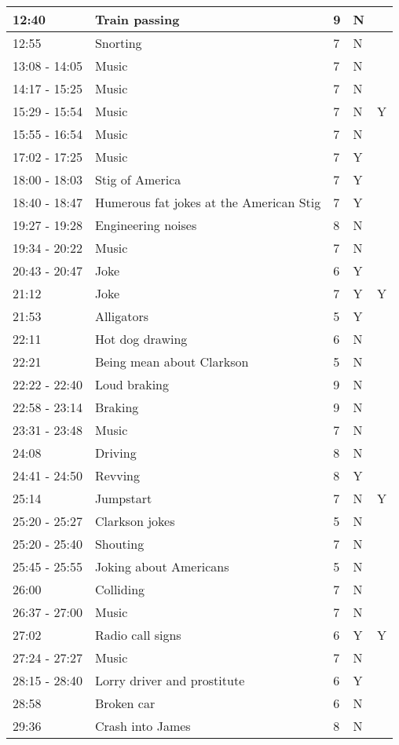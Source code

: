 \begin{longtable}{| p{70pt} | p{130pt} | p{45pt} | p{57pt} | p{60pt}|}
12:40 & Train passing & 9 & N&\\\hline
12:55 & Snorting & 7 & N&\\\hline
13:08 - 14:05 & Music & 7 & N&\\\hline
14:17 - 15:25 & Music & 7 & N&\\\hline
15:29 - 15:54 & Music & 7 & N&Y\\\hline
15:55 - 16:54 & Music & 7 & N&\\\hline
17:02 - 17:25 & Music & 7 & Y&\\\hline
18:00 - 18:03 & Stig of America & 7 & Y&\\\hline
18:40 - 18:47 & Humerous fat jokes at the American Stig & 7 & Y&\\\hline
19:27 - 19:28 & Engineering noises & 8 & N&\\\hline
19:34 - 20:22 & Music & 7 & N&\\\hline
20:43 - 20:47 & Joke & 6 & Y&\\\hline
21:12 & Joke & 7 & Y&Y\\\hline
21:53 & Alligators & 5 & Y&\\\hline
22:11 & Hot dog drawing & 6 & N&\\\hline
22:21 & Being mean about Clarkson & 5 & N&\\\hline
22:22 - 22:40 & Loud braking & 9 & N&\\\hline
22:58 - 23:14 & Braking & 9 & N&\\\hline
23:31 - 23:48 & Music & 7 & N&\\\hline
24:08 & Driving & 8 & N&\\\hline
24:41 - 24:50 & Revving & 8 & Y&\\\hline
25:14 & Jumpstart & 7 & N&Y\\\hline
25:20 - 25:27 & Clarkson jokes & 5 & N&\\\hline
25:20 - 25:40 & Shouting & 7 & N&\\\hline
25:45 - 25:55 & Joking about Americans & 5 & N&\\\hline
26:00 & Colliding & 7 & N&\\\hline
26:37 - 27:00 & Music & 7 & N&\\\hline
27:02 & Radio call signs & 6 & Y&Y\\\hline
27:24 - 27:27 & Music & 7 & N&\\\hline
28:15 - 28:40 & Lorry driver and prostitute & 6 & Y&\\\hline
28:58 & Broken car & 6 & N&\\\hline
29:36 & Crash into James & 8 & N&\\\hline

\end{longtable}
